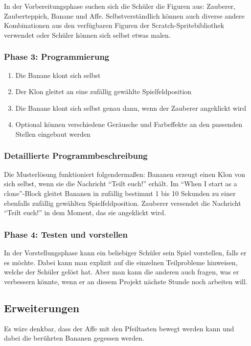 In der Vorbereitungsphase suchen sich die Schüler die Figuren aus:
Zauberer, Zauberteppich, Banane und Affe. Selbstverständlich können auch
diverse andere Kombinationen aus den verfügbaren Figuren der
Scratch-Spritebibliothek verwendet oder Schüler können sich selbst etwas
malen.

\subsubsection{Phase 3: Programmierung}\label{phase-3-programmierung}

\begin{enumerate}
\item
  Die Banane klont sich selbst
\item
  Der Klon gleitet an eine zufällig gewählte Spielfeldposition
\item
  Die Banane klont sich selbst genau dann, wenn der Zauberer angeklickt
  wird
\item
  Optional können verschiedene Geräusche und Farbeffekte an den
  passenden Stellen eingebaut werden
\end{enumerate}

\subsubsection{Detaillierte
Programmbeschreibung}\label{detaillierte-programmbeschreibung}

Die Musterlösung funktioniert folgendermaßen: Bananen erzeugt einen Klon
von sich selbst, wenn sie die Nachricht ``Teilt euch!'' erhält. Im
``When I start as a clone''-Block gleitet Bananen in zufällig bestimmt 1
bis 10 Sekunden zu einer ebenfalls zufällig gewählten Spielfeldposition.
Zauberer versendet die Nachricht ``Teilt euch!'' in dem Moment, das sie
angeklickt wird.

\subsubsection{Phase 4: Testen und
vorstellen}\label{phase-4-testen-und-vorstellen}

In der Vorstellungsphase kann ein beliebiger Schüler sein Spiel
vorstellen, falls er es möchte. Dabei kann man explizit auf die
einzelnen Teilprobleme hinweisen, welche der Schüler gelöst hat. Aber
man kann die anderen auch fragen, was er verbessern könnte, wenn er an
diesem Projekt nächste Stunde noch arbeiten will.

\subsection{Erweiterungen}\label{erweiterungen}

Es wäre denkbar, dass der Affe mit den Pfeiltasten bewegt werden kann
und dabei die berührten Bananen gegessen werden.
